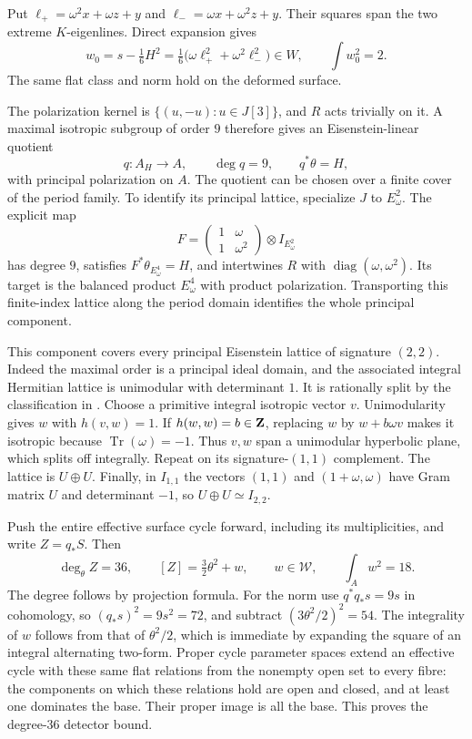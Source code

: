 Put $\ell_+=\omega^2x+\omega z+y$ and
$\ell_-=\omega x+\omega^2z+y$. Their squares span the two extreme $K$-eigenlines. Direct expansion gives
\[
 w_0=s-\tfrac16H^2
   =\tfrac16\bigl(\omega\ell_+^2+\omega^2\ell_-^2\bigr)\in W,
 \qquad \int w_0^2=2.
\]
The same flat class and norm hold on the deformed surface.

The polarization kernel is $\{(u,-u):u\in J[3]\}$, and $R$ acts trivially on it. A maximal isotropic subgroup of order $9$ therefore gives an Eisenstein-linear quotient
\[
 q:A_H\longrightarrow A,\qquad \deg q=9,\qquad q^*\theta=H,
\]
with principal polarization on $A$. The quotient can be chosen over a finite cover of the period family. To identify its principal lattice, specialize $J$ to $E_\omega^2$. The explicit map
\[
 F=\begin{pmatrix}1&\omega\\1&\omega^2\end{pmatrix}
       \otimes I_{E_\omega^2}
\]
has degree $9$, satisfies $F^*\theta_{E_\omega^4}=H$, and intertwines $R$ with $\operatorname{diag}(\omega,\omega^2)$. Its target is the balanced product $E_\omega^4$ with product polarization. Transporting this finite-index lattice along the period domain identifies the whole principal component.

This component covers every principal Eisenstein lattice of signature $(2,2)$. Indeed the maximal order is a principal ideal domain, and the associated integral Hermitian lattice is unimodular with determinant $1$. It is rationally split by the classification in \cite[Proposition~4.1 and Corollary~4.2]{Deligne82}. Choose a primitive integral isotropic vector $v$. Unimodularity gives $w$ with $h(v,w)=1$. If $h(w,w)=b\in\mathbf Z$, replacing $w$ by $w+b\omega v$ makes it isotropic because $\operatorname{Tr}(\omega)=-1$. Thus $v,w$ span a unimodular hyperbolic plane, which splits off integrally. Repeat on its signature-$(1,1)$ complement. The lattice is $U\oplus U$. Finally, in $I_{1,1}$ the vectors $(1,1)$ and $(1+\omega,\omega)$ have Gram matrix $U$ and determinant $-1$, so $U\oplus U\simeq I_{2,2}$.

Push the entire effective surface cycle forward, including its multiplicities, and write $Z=q_*S$. Then
\begin{equation}\label{eq:degree36-class}
 \deg_\theta Z=36,\qquad
 [Z]=\tfrac32\theta^2+w,\qquad
 w\in\mathcal W,\qquad \int_Aw^2=18.
\end{equation}
The degree follows by projection formula. For the norm use $q^*q_*s=9s$ in cohomology, so $(q_*s)^2=9s^2=72$, and subtract $(3\theta^2/2)^2=54$. The integrality of $w$ follows from that of $\theta^2/2$, which is immediate by expanding the square of an integral alternating two-form. Proper cycle parameter spaces extend an effective cycle with these same flat relations from the nonempty open set to every fibre: the components on which these relations hold are open and closed, and at least one dominates the base. Their proper image is all the base. This proves the degree-$36$ detector bound.

